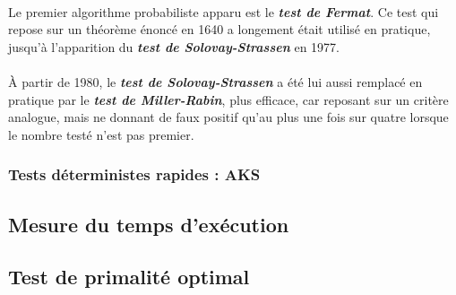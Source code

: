 			\paragraph{}Le premier algorithme probabiliste apparu est le \textit{\textbf{test de Fermat}}. Ce test qui repose sur un théorème énoncé en 1640 a longement était utilisé en pratique, jusqu'à l'apparition du \textit{\textbf{test de Solovay-Strassen}} en 1977. 
			
			\paragraph{} À partir de 1980, le \textit{\textbf{test de Solovay-Strassen}} a été lui aussi remplacé en pratique par le \textit{\textbf{test de Miller-Rabin}}, plus efficace, car reposant sur un critère analogue, mais ne donnant de faux positif qu'au plus une fois sur quatre lorsque le nombre testé n'est pas premier.
			
		\subsubsection*{Tests déterministes rapides : AKS}
		
	
	\subsection{Mesure du temps d'exécution}
		
		
		
		
	\subsection{Test de primalité optimal}
		
